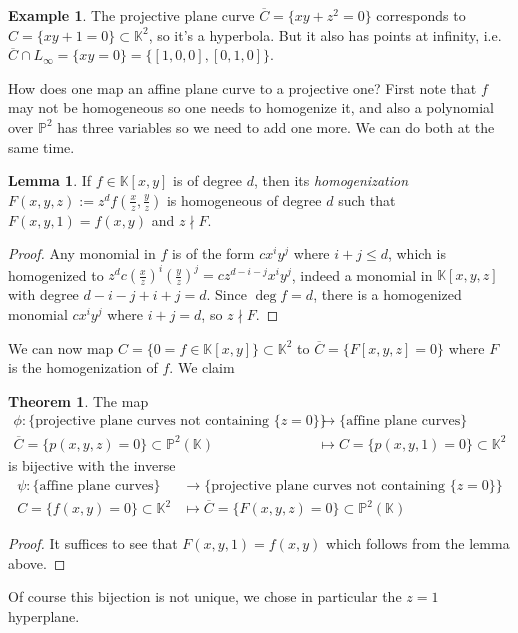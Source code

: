 \documentclass{article}
\newcommand{\K}{\mathbb{K}}
\newcommand{\p}{\mathbb{P}}
\theoremstyle{definition}
\newtheorem{thm}[defn]{Theorem}
\newtheorem{lemma}[defn]{Lemma}
\newtheorem{example}[defn]{Example}
\begin{document}
\begin{example}
The projective plane curve $\overline C=\{xy+z^2=0\}$ corresponds to $C=\{xy+1=0\}\subset\K^2$, so it's a hyperbola. But it also has points at infinity, i.e. $\overline C\cap L_\infty=\{xy=0\}=\{[1,0,0],[0,1,0]\}$.
\end{example}

How does one map an affine plane curve to a projective one? First note that $f$ may not be homogeneous so one needs to homogenize it, and also a polynomial over $\p^2$ has three variables so we need to add one more. We can do both at the same time.

\begin{lemma}
If $f\in\K[x,y]$ is of degree $d$, then its \textit{homogenization} $F(x,y,z):=z^d f\left(\frac{x}{z},\frac{y}{z}\right)$ is homogeneous of degree $d$ such that $F(x,y,1)=f(x,y)$ and $z\nmid F$.
\end{lemma}
\begin{proof}
Any monomial in $f$ is of the form $cx^iy^j$ where $i+j\leq d$, which is homogenized to $z^d c\left(\frac{x}{z}\right)^i\left(\frac{y}{z}\right)^j=cz^{d-i-j}x^iy^j$, indeed a monomial in $\K[x,y,z]$ with degree $d-i-j+i+j=d$. Since $\deg f=d$, there is a homogenized monomial $cx^iy^j$ where $i+j=d$, so $z\nmid F$.
\end{proof}

We can now map $C=\{0=f\in\K[x,y]\}\subset\K^2$ to $\overline C=\{F[x,y,z]=0\}$ where $F$ is the homogenization of $f$. We claim
\begin{thm}
The map
\[
\begin{aligned}
\phi:\{\text{projective plane curves not containing }\{z=0\}\}&\rightarrow\{\text{affine plane curves}\} \\
\overline C=\{p(x,y,z)=0\}\subset\p^2(\K)&\mapsto C=\{p(x,y,1)=0\}\subset\K^2
\end{aligned}
\]
is bijective with the inverse
\[
\begin{aligned}
\psi:\{\text{affine plane curves}\}&\rightarrow\{\text{projective plane curves not containing }\{z=0\}\} \\
C=\{f(x,y)=0\}\subset\K^2&\mapsto\overline C=\{F(x,y,z)=0\}\subset\p^2(\K)
\end{aligned}
\]
\end{thm}
\begin{proof}
It suffices to see that $F(x,y,1)=f(x,y)$ which follows from the lemma above.
\end{proof}
Of course this bijection is not unique, we chose in particular the $z=1$ hyperplane.
\end{document}
